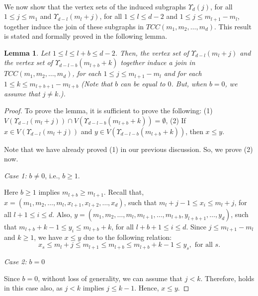\documentclass[twoside, 11pt]{article}
\newtheorem{lemma}{Lemma}
\newcommand{\M}{TCC(m_1,m_2,\dots,m_d)}
\newcommand{\Y}{\Upsilon}
\begin{document}
~~~

 We now show that the vertex sets of the induced subgraphs $\Y_d(j)$, for all $1\leq j \leq m_1$ and $\Y_{d-l}(m_l+j)$, for all $1 \leq l \leq d-2$ and $1 \leq j \leq m_{l+1}-m_l$, together induce the join of these subgraphs in $\M$. This result is stated and formally proved in the following lemma.

\begin{lemma}\label{induced subgraph is a join}
     Let $1 \leq l \leq l+b \leq d-2$. Then, the vertex set of $\Y_{d-l}(m_l+j)$ and the vertex set of $\Y_{d-l-b}(m_{l+b}+k)$ together induce a join in $\M$, for each $1 \leq j \leq m_{l+1}-m_l$ and for each $1\leq k \leq m_{l+b+1}-m_{l+b}$ (Note that $b$ can be equal to $0$. But, when $b=0$, we assume that $j \neq k$.).

     
     
\end{lemma}
\begin{proof}
    
  To prove the lemma,  it is sufficient to prove the following: (1) $V(\Y_{d-l}(m_l+j)) \cap V(\Y_{d-l-b}(m_{l+b}+k)) = \emptyset$, (2) If $x \in V(\Y_{d-l}(m_l+j))$ and $y \in V(\Y_{d-l-b}(m_{l+b}+k))$, then $x \leq y$.

    Note that we have already proved (1) in our previous discussion. So, we prove (2) now.

    \textit{Case 1:} $b \neq 0$, i.e., $b \geq 1$.

    Here $b\geq 1$ implies $m_{l+b} \geq m_{l+1}$. Recall that, $x=(m_1,m_2,\dots,m_l,x_{l+1},x_{l+2},\dots,x_d)$, such that $m_l + j -1 \leq x_i \leq m_l +j$, for all $l+1 \leq i \leq d$.   
    Also, $y=(m_1,m_2,\dots,m_l,m_{l+1},\dots,m_{l+b},y_{l+b+1},\dots,y_d)$, such that $m_{l+b} + k -1 \leq y_i \leq m_{l+b} +k$, for all $l+b+1 \leq i \leq d$.
    Since $j \leq m_{l+1}- m_l$ and $k \geq 1$, we have $x \leq y$ due to the following relation:
    \begin{equation}\label{eq 2}
        x_s \leq m_l +j \leq m_{l+1} \leq m_{l+b} \leq m_{l+b} + k -1 \leq y_s, \text{ for all } s.
    \end{equation}

    \textit{Case 2:} $b=0$

    Since $b=0$, without loss of generality, we can assume that $j<k$. Therefore,  holds in this case also, as $j < k$ implies $j \leq k-1$. Hence, $x \leq y$.\end{proof}
\end{document}
